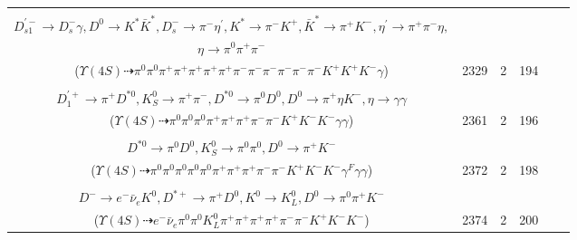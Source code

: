 \documentclass[landscape]{article}
\newcounter{rownumbers}
\newcommand\rn{\stepcounter{rownumbers}\arabic{rownumbers}}
\newcommand{\EOLP}{\\ \hline} %
\newcommand{\topoTags}[1]{#1} %
\begin{document}
\begin{longtable}{clcccc}
\rn & \makecell[l]{ $ 
\Upsilon(4S) \rightarrow B^{0} \bar{B}^{0} ,
B^{0} \rightarrow \rho^{+} D^{-} ,
\bar{B}^{0} \rightarrow D^{*+} D_{s1}^{\prime-} ,
\rho^{+} \rightarrow \pi^{0} \pi^{+} ,
D^{-} \rightarrow \pi^{-} \pi^{-} K^{+} ,
D^{*+} \rightarrow \pi^{+} D^{0} ,
$ \\ $
D_{s1}^{\prime-} \rightarrow D_{s}^{-} \gamma ,
D^{0} \rightarrow K^{*} \bar{K}^{*} ,
D_{s}^{-} \rightarrow \pi^{-} \eta^{\prime} ,
K^{*} \rightarrow \pi^{-} K^{+} ,
\bar{K}^{*} \rightarrow \pi^{+} K^{-} ,
\eta^{\prime} \rightarrow \pi^{+} \pi^{-} \eta ,
$ \\ $
\eta \rightarrow \pi^{0} \pi^{+} \pi^{-} 
$ \\ ($
\Upsilon(4S) \dashrightarrow \pi^{0} \pi^{0} \pi^{+} \pi^{+} \pi^{+} \pi^{+} \pi^{+} \pi^{-} \pi^{-} \pi^{-} \pi^{-} \pi^{-} \pi^{-} K^{+} K^{+} K^{-} \gamma 
$) } & \topoTags{2329 & }2 & 194 \EOLP

\rn & \makecell[l]{ $ 
\Upsilon(4S) \rightarrow B^{0} \bar{B}^{0} ,
B^{0} \rightarrow K^{0} K^{+} K_{0}^{*-} ,
\bar{B}^{0} \rightarrow \rho^{-} D_{1}^{\prime+} ,
K^{0} \rightarrow K_{S}^{0} ,
K_{0}^{*-} \rightarrow \pi^{0} K^{-} ,
\rho^{-} \rightarrow \pi^{0} \pi^{-} ,
$ \\ $
D_{1}^{\prime+} \rightarrow \pi^{+} D^{*0} ,
K_{S}^{0} \rightarrow \pi^{+} \pi^{-} ,
D^{*0} \rightarrow \pi^{0} D^{0} ,
D^{0} \rightarrow \pi^{+} \eta K^{-} ,
\eta \rightarrow \gamma \gamma 
$ \\ ($
\Upsilon(4S) \dashrightarrow \pi^{0} \pi^{0} \pi^{0} \pi^{+} \pi^{+} \pi^{+} \pi^{-} \pi^{-} K^{+} K^{-} K^{-} \gamma \gamma 
$) } & \topoTags{2361 & }2 & 196 \EOLP

\rn & \makecell[l]{ $ 
\Upsilon(4S) \rightarrow B^{0} \bar{B}^{0} ,
B^{0} \rightarrow \pi^{0} \rho^{0} \pi^{+} \eta K^{+} K^{-} D^{-} ,
\bar{B}^{0} \rightarrow \pi^{0} D^{*0} ,
\rho^{0} \rightarrow \pi^{+} \pi^{-} \gamma^{F} ,
\eta \rightarrow \gamma \gamma ,
D^{-} \rightarrow \pi^{-} K_{S}^{0} ,
$ \\ $
D^{*0} \rightarrow \pi^{0} D^{0} ,
K_{S}^{0} \rightarrow \pi^{0} \pi^{0} ,
D^{0} \rightarrow \pi^{+} K^{-} 
$ \\ ($
\Upsilon(4S) \dashrightarrow \pi^{0} \pi^{0} \pi^{0} \pi^{0} \pi^{0} \pi^{+} \pi^{+} \pi^{+} \pi^{-} \pi^{-} K^{+} K^{-} K^{-} \gamma^{F} \gamma \gamma 
$) } & \topoTags{2372 & }2 & 198 \EOLP

\rn & \makecell[l]{ $ 
\Upsilon(4S) \rightarrow B^{0} \bar{B}^{0} ,
B^{0} \rightarrow \rho^{+} D^{-} ,
\bar{B}^{0} \rightarrow \bar{K}^{*} D^{-} D^{*+} ,
\rho^{+} \rightarrow \pi^{0} \pi^{+} ,
D^{-} \rightarrow \pi^{-} \pi^{-} K^{+} ,
\bar{K}^{*} \rightarrow \pi^{+} K^{-} ,
$ \\ $
D^{-} \rightarrow e^{-} \bar{\nu}_{e} K^{0} ,
D^{*+} \rightarrow \pi^{+} D^{0} ,
K^{0} \rightarrow K_{L}^{0} ,
D^{0} \rightarrow \pi^{0} \pi^{+} K^{-} 
$ \\ ($
\Upsilon(4S) \dashrightarrow e^{-} \bar{\nu}_{e} \pi^{0} \pi^{0} K_{L}^{0} \pi^{+} \pi^{+} \pi^{+} \pi^{+} \pi^{-} \pi^{-} K^{+} K^{-} K^{-} 
$) } & \topoTags{2374 & }2 & 200 \EOLP


\end{longtable}
\end{document}

